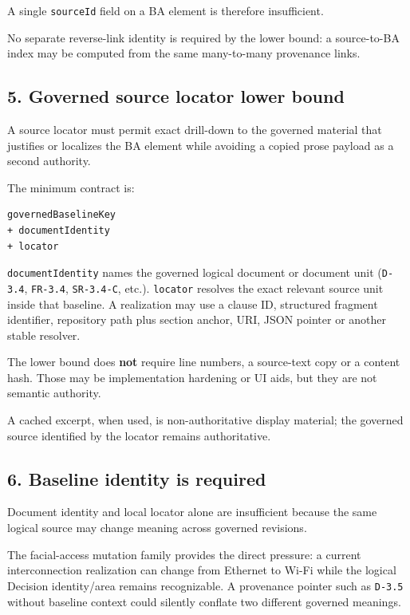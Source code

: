 \documentclass[11pt,a4paper]{article}
\begin{document}
A single \texttt{sourceId} field on a BA element is therefore insufficient.

No separate reverse-link identity is required by the lower bound: a source-to-BA index may be computed from the same many-to-many provenance links.

\subsection{5. Governed source locator lower bound}\label{5-governed-source-locator-lower-bound}

A source locator must permit exact drill-down to the governed material that justifies or localizes the BA element while avoiding a copied prose payload as a second authority.

The minimum contract is:

\begin{verbatim}
governedBaselineKey
+ documentIdentity
+ locator
\end{verbatim}

\texttt{documentIdentity} names the governed logical document or document unit (\texttt{D-3.4}, \texttt{FR-3.4}, \texttt{SR-3.4-C}, etc.). \texttt{locator} resolves the exact relevant source unit inside that baseline. A realization may use a clause ID, structured fragment identifier, repository path plus section anchor, URI, JSON pointer or another stable resolver.

The lower bound does \textbf{not} require line numbers, a source-text copy or a content hash. Those may be implementation hardening or UI aids, but they are not semantic authority.

A cached excerpt, when used, is non-authoritative display material; the governed source identified by the locator remains authoritative.

\subsection{6. Baseline identity is required}\label{6-baseline-identity-is-required}

Document identity and local locator alone are insufficient because the same logical source may change meaning across governed revisions.

The facial-access mutation family provides the direct pressure: a current interconnection realization can change from Ethernet to Wi-Fi while the logical Decision identity/area remains recognizable. A provenance pointer such as \texttt{D-3.5} without baseline context could silently conflate two different governed meanings.
\end{document}
